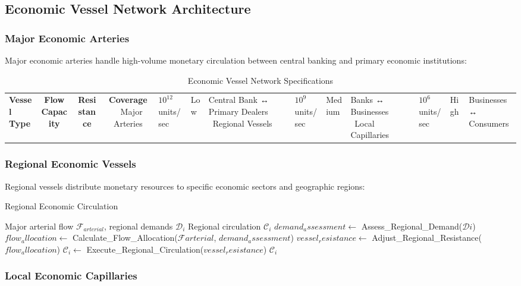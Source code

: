 \subsection{Economic Vessel Network Architecture}

\subsubsection{Major Economic Arteries}

Major economic arteries handle high-volume monetary circulation between central banking and primary economic institutions:

\begin{table}[h]
\centering
\caption{Economic Vessel Network Specifications}
\begin{tabular}{@{}lccc@{}}
\toprule
\textbf{Vessel Type} & \textbf{Flow Capacity} & \textbf{Resistance} & \textbf{Coverage} \
\midrule
Major Arteries & $10^{12}$ units/sec & Low & Central Bank ↔ Primary Dealers \
Regional Vessels & $10^{9}$ units/sec & Medium & Banks ↔ Businesses \
Local Capillaries & $10^{6}$ units/sec & High & Businesses ↔ Consumers \
\bottomrule
\end{tabular}
\end{table}

\subsubsection{Regional Economic Vessels}

Regional vessels distribute monetary resources to specific economic sectors and geographic regions:

\begin{algorithm}
\caption{Regional Economic Circulation}
\begin{algorithmic}[1]
\require Major arterial flow $\mathcal{F}_{arterial}$, regional demands ${\mathcal{D}_i}$
\ensure Regional circulation ${\mathcal{C}_i}$
\FOR{each region $i$}
\STATE $demand_assessment \leftarrow$ Assess_Regional_Demand($\mathcal{D}i$)
\STATE $flow_allocation \leftarrow$ Calculate_Flow_Allocation($\mathcal{F}{arterial}$, $demand_assessment$)
\STATE $vessel_resistance \leftarrow$ Adjust_Regional_Resistance($flow_allocation$)
\STATE $\mathcal{C}_i \leftarrow$ Execute_Regional_Circulation($vessel_resistance$)
\ENDFOR
\RETURN ${\mathcal{C}_i}$
\end{algorithmic}
\end{algorithm}

\subsubsection{Local Economic Capillaries}

